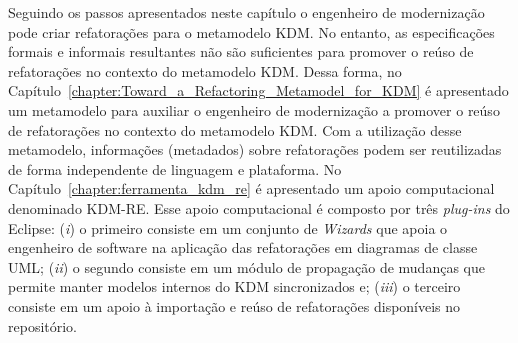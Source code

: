 Seguindo os passos apresentados neste capítulo o engenheiro de modernização pode criar refatorações para o metamodelo KDM. No entanto, as especificações formais e informais resultantes não são suficientes para promover o reúso de refatorações no contexto do metamodelo KDM. Dessa forma, no Capítulo~\ref{chapter:Toward_a_Refactoring_Metamodel_for_KDM} é apresentado um metamodelo para auxiliar o engenheiro de modernização a promover o reúso de refatorações no contexto do metamodelo KDM. Com a utilização desse metamodelo, informações (metadados) sobre refatorações podem ser reutilizadas de forma independente de linguagem e plataforma. %
No Capítulo~\ref{chapter:ferramenta_kdm_re} é apresentado um apoio computacional denominado KDM-RE. Esse apoio computacional é composto por três \textit{plug-ins} do Eclipse: (\textit{i}) o primeiro consiste em um conjunto de \textit{Wizards} que apoia o engenheiro de software na aplicação das refatorações em diagramas de classe UML; (\textit{ii}) o segundo consiste em um módulo de propagação de mudanças que permite manter modelos internos do KDM sincronizados e; (\textit{iii}) o terceiro consiste em um apoio à importação e reúso de refatorações disponíveis no repositório.
